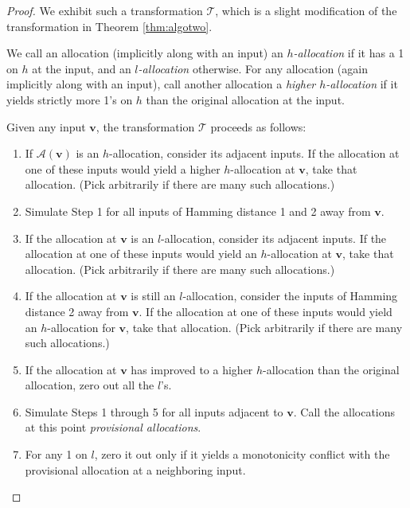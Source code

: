 \documentclass[runningheads,a4paper]{llncs}
\begin{document}
\begin{proof}
We exhibit such a transformation $\mathcal{T}$, which is a slight modification of the transformation in Theorem \ref{thm:algotwo}. 

We call an allocation (implicitly along with an input) an \textit{$h$-allocation} if it has a 1 on $h$ at the input, and an \textit{$l$-allocation} otherwise. For any allocation (again implicitly along with an input), call another allocation a \textit{higher $h$-allocation} if it yields strictly more 1's on $h$ than the original allocation at the input.

Given any input $\textbf{v}$, the transformation $\mathcal{T}$ proceeds as follows:

\begin{enumerate}
\item If $\mathcal{A}(\textbf{v})$ is an $h$-allocation, consider its adjacent inputs. If the allocation at one of these inputs would yield a higher $h$-allocation at $\textbf{v}$, take that allocation. (Pick arbitrarily if there are many such allocations.)

\item Simulate Step 1 for all inputs of Hamming distance 1 and 2 away from $\textbf{v}$.

\item If the allocation at $\textbf{v}$ is an $l$-allocation, consider its adjacent inputs. If the allocation at one of these inputs would yield an $h$-allocation at $\textbf{v}$, take that allocation. (Pick arbitrarily if there are many such allocations.)

\item If the allocation at $\textbf{v}$ is still an $l$-allocation, consider the inputs of Hamming distance 2 away from $\textbf{v}$. If the allocation at one of these inputs would yield an $h$-allocation for $\textbf{v}$, take that allocation. (Pick arbitrarily if there are many such allocations.)

\item If the allocation at $\textbf{v}$ has improved to a higher $h$-allocation than the original allocation, zero out all the $l$'s.

\item Simulate Steps 1 through 5 for all inputs adjacent to $\textbf{v}$. Call the allocations at this point \textit{provisional allocations}. 

\item For any 1 on $l$, zero it out only if it yields a monotonicity conflict with the provisional allocation at a neighboring input.
\end{enumerate}


\end{proof}
\end{document}
